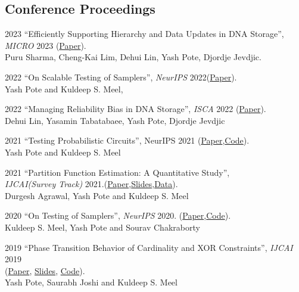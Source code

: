 \documentclass[12pt,letterpaper]{report}
\begin{document}
    \subsection*{Conference Proceedings}

    \begin{tablist}       
    	
    	\item[2023] \tab  \enquote{Efficiently Supporting Hierarchy and Data Updates in DNA Storage}, \textit{MICRO} 2023 (\href{https://arxiv.org/abs/2212.13447}{Paper}).\\
    	Puru Sharma, Cheng-Kai Lim, Dehui Lin, Yash Pote, Djordje Jevdjic.
    	    	
    	\item[2022] \tab  \enquote{On Scalable Testing of Samplers},  \textit{NeurIPS}  2022(\href{https://arxiv.org/abs/2306.13958}{Paper}).\\
		Yash Pote  and Kuldeep S. Meel,
		    		
    	\item[2022] \tab  \enquote{Managing Reliability Bias in DNA Storage}, \textit{ISCA}  2022 (\href{https://arxiv.org/abs/2204.12261}{Paper}).\\
    	Dehui Lin, Yasamin Tabatabaee, Yash Pote, Djordje Jevdjic
    				
    	\item[2021] \tab  \enquote{Testing Probabilistic Circuits},  {NeurIPS}  2021 (\href{https://arxiv.org/abs/2112.04941}{Paper},\href{https://github.com/meelgroup/teq}{Code}).\\
    	Yash Pote  and Kuldeep S. Meel
    	
    	\item[2021] \tab  \enquote{Partition Function Estimation: A Quantitative Study}, \\ \textit{IJCAI(Survey Track)}  2021.(\href{https://arxiv.org/abs/2105.11132}{Paper},\href{https://meelgroup.github.io/publication/ijcai21_partition}{Slides},\href{https://doi.org/10.5281/zenodo.4769117}{Data}).\\
    	Durgesh Agrawal, Yash Pote  and Kuldeep S. Meel
    	
    	\item[2020] \tab  \enquote{On Testing of Samplers}, \textit{NeurIPS} 2020. (\href{https://arxiv.org/abs/2010.12918}{Paper},\href{https://github.com/meelgroup/barbarik}{Code}).\\
    	Kuldeep S. Meel, Yash Pote  and Sourav Chakraborty
    	
        \item[2019] \tab \enquote{Phase Transition Behavior of Cardinality and
        XOR Constraints}, \textit{IJCAI} 2019\\ (\href{https://arxiv.org/abs/1910.09755}{Paper}, \href{https://meelgroup.github.io/files/slides/ijcai19pjm.pdf}{Slides}, \href{https://github.com/meelgroup/1-CARD-XOR/}{Code}).\\
        Yash Pote, Saurabh Joshi and Kuldeep S. Meel

	
    \end{tablist}
\end{document}
